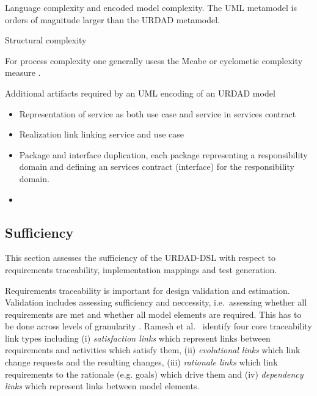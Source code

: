 Language complexity and encoded model complexity. The UML metamodel is orders of magnitude larger than the URDAD metamodel. 


Structural complexity

For process complexity one generally usess the Mcabe or cyclometic complexity measure \cite{mccabe_complexity_1976}.

Additional artifacts required by an UML encoding of an URDAD model
\begin{itemize}
  \item Representation of service as both use case and service in services contract
  \item Realization link linking service and use case
  \item Package and interface duplication, each package representing a responsibility domain and defining an services contract (interface) for the responsibility domain.
  \item
\end{itemize}



\subsection{Sufficiency}

This section assesses the sufficiency of the URDAD-DSL with respect to requirements traceability, implementation mappings and test generation. 

Requirements traceability is important for design validation and estimation. Validation includes assessing sufficiency and neccessity, i.e.\ assessing whether all requirements are met and whether all model elements are required. This has to be done across levels of granularity \cite{dick_design_2005}. Ramesh et al.\ \cite{ramesh_toward_2001} identify four core traceability link types including (i) \emph{satisfaction links} which represent links between requirements and activities which satisfy them, (ii) \emph{evolutional links} which link change requests and the resulting changes, (iii) \emph{rationale links} which link requirements to the rationale (e.g. goals) which drive them and (iv) \emph{dependency links} which represent links between model elements.

